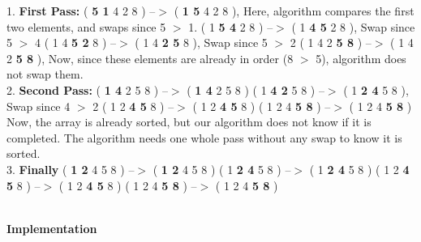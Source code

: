 1. \textbf{First Pass:}\newline
( \textbf{5 1} 4 2 8 ) –$>$ ( \textbf{1 5} 4 2 8 ), Here, algorithm compares the first two elements, and swaps since 5 $>$ 1.\newline
( 1 \textbf{5 4} 2 8 ) –$>$  ( 1 \textbf{4 5} 2 8 ), Swap since 5 $>$ 4\newline
( 1 4 \textbf{5 2} 8 ) –$>$  ( 1 4\textbf{ 2 5} 8 ), Swap since 5 $>$ 2\newline
( 1 4 2 \textbf{5 8} ) –$>$ ( 1 4 2 \textbf{5 8} ), Now, since these elements are already in order (8 $>$ 5), algorithm does not swap them.
\newline
\\
2. \textbf{Second Pass:}\newline
( \textbf{1 4} 2 5 8 ) –$>$ ( \textbf{1 4} 2 5 8 )\newline
( 1 \textbf{4 2} 5 8 ) –$>$ ( 1 \textbf{2 4} 5 8 ), Swap since 4 $>$ 2\newline
( 1 2 \textbf{4 5} 8 ) –$>$ ( 1 2 \textbf{4 5} 8 )\newline
( 1 2 4 \textbf{5 8} ) –$>$  ( 1 2 4 \textbf{5 8} )\newline
Now, the array is already sorted, but our algorithm does not know if it is completed. The algorithm needs one whole pass without any swap to know it is sorted.
\newline
\\
3. \textbf{Finally}\newline
( \textbf{1 2} 4 5 8 ) –$>$ ( \textbf{1 2} 4 5 8 )\newline
( 1 \textbf{2 4} 5 8 ) –$>$ ( 1 \textbf{2 4} 5 8 )\newline
( 1 2 \textbf{4 5} 8 ) –$>$ ( 1 2 \textbf{4 5} 8 )\newline
( 1 2 4 \textbf{5 8} ) –$>$ ( 1 2 4 \textbf{5 8} )\newline

\newline
\\
\newpage
\textbf{{\Large{Implementation}}}

